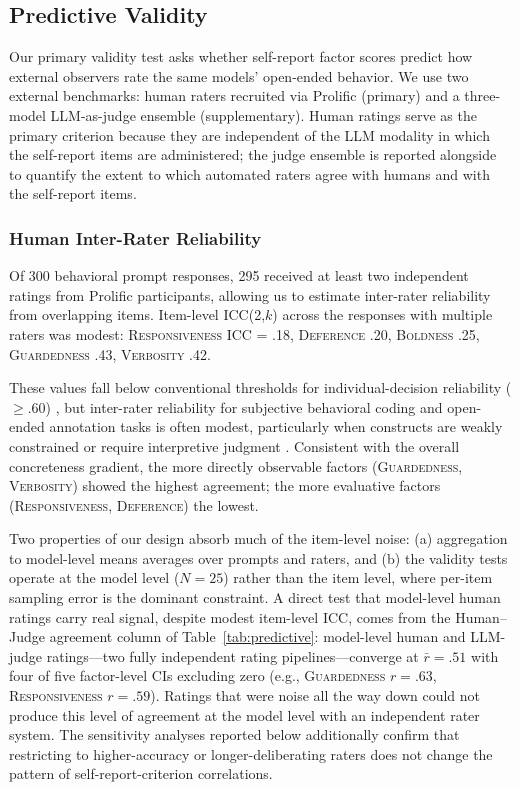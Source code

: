 \documentclass[11pt]{article}
\newcommand{\factorname}[1]{\textsc{#1}}
\begin{document}
\subsection{Predictive Validity}
\label{sec:predictive}

Our primary validity test asks whether self-report factor scores predict how external observers rate the same models' open-ended behavior. We use two external benchmarks: human raters recruited via Prolific (primary) and a three-model LLM-as-judge ensemble (supplementary).
Human ratings serve as the primary criterion because they are independent of the LLM modality in which the self-report items are administered; the judge ensemble is reported alongside to quantify the extent to which automated raters agree with humans and with the self-report items.

\subsubsection{Human Inter-Rater Reliability}
Of 300 behavioral prompt responses, 295 received at least two independent ratings from Prolific participants, allowing us to estimate inter-rater reliability from overlapping items.
Item-level ICC(2,$k$) across the responses with multiple raters was modest: \factorname{Responsiveness} ICC = .18, \factorname{Deference} .20, \factorname{Boldness} .25, \factorname{Guardedness} .43, \factorname{Verbosity} .42.

These values fall below conventional thresholds for individual-decision reliability ($\geq .60$) \citep{shrout1979intraclass}, but inter-rater reliability for subjective behavioral coding and open-ended annotation tasks is often modest, particularly when constructs are weakly constrained or require interpretive judgment \citep{hallgren2012computing, krippendorff2018content}.
Consistent with the overall concreteness gradient, the more directly observable factors (\factorname{Guardedness}, \factorname{Verbosity}) showed the highest agreement; the more evaluative factors (\factorname{Responsiveness}, \factorname{Deference}) the lowest.

Two properties of our design absorb much of the item-level noise: (a) aggregation to model-level means averages over prompts and raters, and (b) the validity tests operate at the model level ($N = 25$) rather than the item level, where per-item sampling error is the dominant constraint.
A direct test that model-level human ratings carry real signal, despite modest item-level ICC, comes from the Human--Judge agreement column of Table~\ref{tab:predictive}: model-level human and LLM-judge ratings---two fully independent rating pipelines---converge at $\bar{r} = .51$ with four of five factor-level CIs excluding zero (e.g., \factorname{Guardedness} $r = .63$, \factorname{Responsiveness} $r = .59$). Ratings that were noise all the way down could not produce this level of agreement at the model level with an independent rater system. The sensitivity analyses reported below additionally confirm that restricting to higher-accuracy or longer-deliberating raters does not change the pattern of self-report-criterion correlations.
\end{document}
